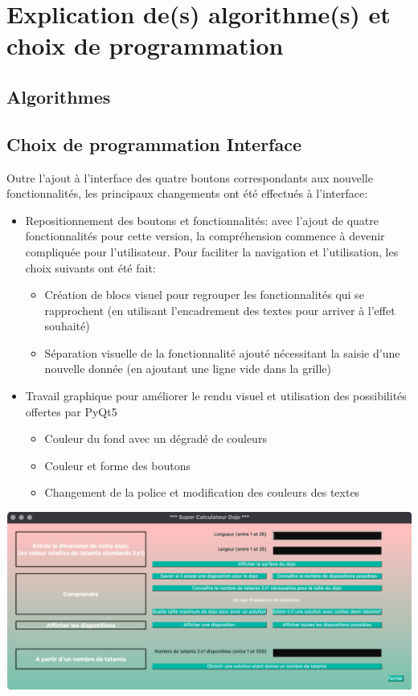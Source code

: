 \section{Explication de(s) algorithme(s) et choix de programmation}

\subsection{Algorithmes}

\subsection{Choix de programmation Interface}

Outre l’ajout à l'interface des quatre boutons correspondants aux nouvelle fonctionnalités, 
les principaux changements ont été effectués à l’interface:

\begin{itemize}
    \item Repositionnement des boutons et fonctionnalités: avec l’ajout de quatre fonctionnalités 
    pour cette version, la compréhension commence à devenir compliquée pour l’utilisateur. 
    Pour faciliter la navigation et l’utilisation, les choix suivants ont été fait:
    \begin{itemize}
        \item Création de blocs visuel pour regrouper les fonctionnalités qui se rapprochent 
        (en utilisant l’encadrement des textes pour arriver à l'effet souhaité)
        \item Séparation visuelle de la fonctionnalité ajouté nécessitant la saisie d’une nouvelle 
        donnée (en ajoutant une ligne vide dans la grille)
    \end{itemize}

    \item Travail graphique pour améliorer le rendu visuel et utilisation des possibilités offertes par PyQt5
    
    \begin{itemize}
        \item  Couleur du fond avec un dégradé de couleurs
        \item Couleur et forme des boutons
        \item Changement de la police et modification des couleurs des textes
    \end{itemize}
\end{itemize}


\begin{center}
    \includegraphics[scale=0.25]{images/releaseInterface.png}
\end{center}


